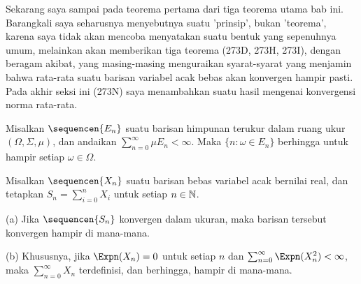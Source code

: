 
\def\chaptername{Teori probabilitas}
\def\sectionname{Hukum kuat bilangan besar}


Sekarang saya sampai pada teorema pertama dari tiga teorema utama bab
ini. Barangkali saya seharusnya menyebutnya suatu 'prinsip', bukan
'teorema', karena saya tidak akan mencoba menyatakan suatu bentuk yang
sepenuhnya umum, melainkan akan memberikan tiga teorema (273D, 273H,
273I), dengan beragam akibat, yang masing-masing menguraikan syarat-syarat
yang menjamin bahwa rata-rata suatu barisan variabel acak bebas akan
konvergen hampir pasti. Pada akhir seksi ini (273N) saya menambahkan suatu
hasil mengenai konvergensi norma rata-rata.

 Misalkan $\sequencen{E_n}$ suatu barisan himpunan
terukur dalam ruang ukur $(\Omega,\Sigma,\mu)$, dan andaikan
$\sum_{n=0}^{\infty}\mu E_n<\infty$. Maka $\{n:\omega\in E_n\}$
berhingga untuk hampir setiap $\omega\in\Omega$.


 Misalkan $\sequencen{X_n}$ suatu barisan bebas
variabel acak bernilai real, dan tetapkan $S_n=\sum_{i=0}^nX_i$ untuk
setiap $n\in\Bbb N$.

(a) Jika $\sequencen{S_n}$ konvergen dalam ukuran, maka barisan tersebut
konvergen hampir di mana-mana.

(b) Khususnya, jika $\Expn(X_n)=0$ untuk setiap $n$ dan
$\sum_{n=0}^{\infty}\Expn(X_n^2)<\infty$, maka
$\sum_{n=0}^{\infty}X_n$ terdefinisi, dan berhingga, hampir di mana-mana.

